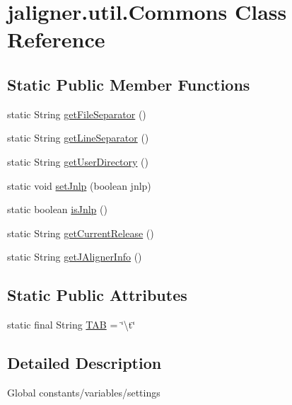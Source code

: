 \hypertarget{classjaligner_1_1util_1_1_commons}{\section{jaligner.\+util.\+Commons Class Reference}
\label{classjaligner_1_1util_1_1_commons}
}
\subsection*{Static Public Member Functions}
\begin{DoxyCompactItemize}
\item 
static String \hyperlink{classjaligner_1_1util_1_1_commons_a9b2cbfa8be21ef473f93c439f1b2fb48}{get\+File\+Separator} ()
\item 
static String \hyperlink{classjaligner_1_1util_1_1_commons_ad1b4cbeb53ca9107e3979a6a5ba1fe50}{get\+Line\+Separator} ()
\item 
static String \hyperlink{classjaligner_1_1util_1_1_commons_a42fc068e5fc2e61ed19cb267354bcc24}{get\+User\+Directory} ()
\item 
static void \hyperlink{classjaligner_1_1util_1_1_commons_a3bd050e7f48d16e182f8d0acfc433e1c}{set\+Jnlp} (boolean jnlp)
\item 
static boolean \hyperlink{classjaligner_1_1util_1_1_commons_aadca0c521881611256cc7aa24cab4cdd}{is\+Jnlp} ()
\item 
static String \hyperlink{classjaligner_1_1util_1_1_commons_a355a1dea60e473b31ff8ad60bb56b994}{get\+Current\+Release} ()
\item 
static String \hyperlink{classjaligner_1_1util_1_1_commons_a980e171044753b15ecf040cf68f5a99d}{get\+J\+Aligner\+Info} ()
\end{DoxyCompactItemize}
\subsection*{Static Public Attributes}
\begin{DoxyCompactItemize}
\item 
static final String \hyperlink{classjaligner_1_1util_1_1_commons_a2df8b17be1dbabf911eddbe8a155e5eb}{T\+A\+B} = \char`\"{}\textbackslash{}t\char`\"{}
\end{DoxyCompactItemize}


\subsection{Detailed Description}
Global constants/variables/settings


